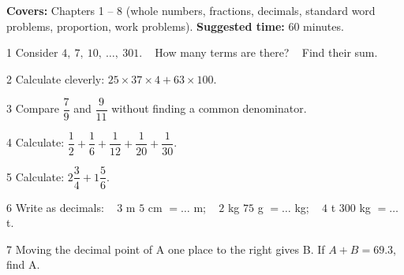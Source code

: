 \begin{knowbox}
\textbf{Covers:} Chapters 1 -- 8 (whole numbers, fractions, decimals, standard word problems, proportion, work problems). \quad \textbf{Suggested time:} $60$ minutes.
\end{knowbox}
\gap
\begin{probbox}{1}{\relax}
Consider $4,\ 7,\ 10,\ \ldots,\ 301$. \  How many terms are there? \  Find their sum.
\end{probbox}
\gap
\begin{probbox}{2}{\relax}
Calculate cleverly: $25\times37\times4+63\times100$.
\end{probbox}
\gap
\begin{probbox}{3}{\relax}
Compare $\dfrac79$ and $\dfrac9{11}$ without finding a common denominator.
\end{probbox}
\gap
\begin{probbox}{4}{\relax}
Calculate: $\dfrac12+\dfrac16+\dfrac1{12}+\dfrac1{20}+\dfrac1{30}$.
\end{probbox}
\gap
\begin{probbox}{5}{\relax}
Calculate: $2\dfrac34+1\dfrac56$.
\end{probbox}
\gap
\begin{probbox}{6}{\relax}
Write as decimals: \  $3$ m $5$ cm $=\ldots$ m; \  $2$ kg $75$ g $=\ldots$ kg; \  $4$ t $300$ kg $=\ldots$ t.
\end{probbox}
\gap
\begin{probbox}{7}{\relax}
Moving the decimal point of A one place to the right gives B. If $A+B=69.3$, find A.
\end{probbox}
